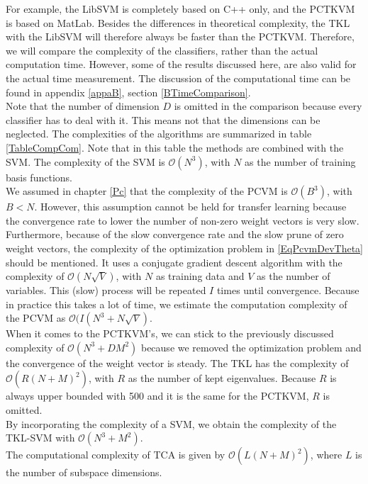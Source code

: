 For example, the LibSVM is completely based on C++ only, and the \acs{PCTKVM} is based on MatLab. 
Besides the differences in theoretical complexity, the \acs{TKL} with the LibSVM will therefore always be faster than the \acs{PCTKVM}.
Therefore, we will compare the complexity of the classifiers, rather than the actual computation time.
However, some of the results discussed here, are also valid for the actual time measurement. 
The discussion of the computational time can be found in appendix \ref{appaB}, section \ref{BTimeComparison}.\\
Note that the number of dimension $D$ is omitted in the comparison because every classifier has to deal with it.
This means not that the dimensions can be neglected.
The complexities of the algorithms are summarized in table \ref{TableCompCom}.
Note that in this table the methods are combined with the \acs{SVM}.
The complexity of the \acs{SVM} is $\mathcal{O}(N^3)$, with $N$ as the number of training basis functions.\\
We assumed in chapter \ref{Pc} that the complexity of the \acs{PCVM} is $\mathcal{O}(B^3)$, with $B < N$.
However, this assumption cannot be held for transfer learning because the convergence rate to lower the number of non-zero weight vectors is very slow.
Furthermore, because of the slow convergence rate and the slow prune of zero weight vectors, the complexity of the optimization problem in \ref{EqPcvmDevTheta} should be mentioned.
It uses a conjugate gradient descent algorithm with the complexity of $\mathcal{O}(N\sqrt{V})$, with $N$ as training data and $V$ as the number of variables.\cite[p. 37-38]{Shewchuk.1994}
This (slow) process will be repeated $I$ times until convergence. Because in practice this takes a lot of time, we estimate the computation complexity of the \acs{PCVM} as $\mathcal{O}(I(N^3+N\sqrt{V})$.\\
When it comes to the \acs{PCTKVM}'s, we can stick to the previously discussed complexity of $\mathcal{O}(N^3+DM^2)$ because we removed the optimization problem and the convergence of the weight vector is steady. 
The \acs{TKL} has the complexity of $\mathcal{O}(R(N+M)^2)$, with $R$ as the number of kept eigenvalues.
Because $R$ is always upper bounded with 500 and it is the same for the \acs{PCTKVM}, $R$ is omitted.\\
By incorporating the complexity of a \acs{SVM}, we obtain the complexity of the \acs{TKL}-\acs{SVM} with $\mathcal{O}(N^3+M^2)$.\\
The computational complexity of \acs{TCA} is given by $\mathcal{O}(L(N+M)^2)$, where $L$ is the number of subspace dimensions.
